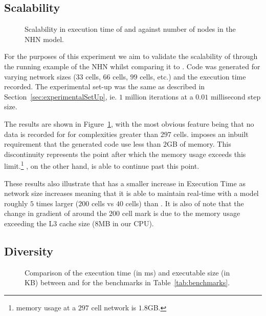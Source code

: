 \subsection{Scalability}

\begin{figure}[htbp]
  \centering
  
  \caption{Scalability in  execution time of \simulink and \ourTool against 
  number of nodes in the \acf{NHN} model.}
  \label{fig:scalability}
\end{figure}

For the purposes of this experiment we aim to validate the scalability of
\ourTool through the running example of the \ac{NHN} whilst comparing it
to \simulink.  Code was generated for varying network sizes ($33$ cells,
$66$ cells, $99$ cells, etc.) and the execution time recorded.  The
experimental set-up was the same as described in
Section~\ref{sec:experimentalSetUp}, ie. $1$ million iterations at a
$0.01$ millisecond step size.

The results are shown in Figure~\ref{fig:scalability}, with the most
obvious feature being that no data is recorded for \simulink for
complexities greater than $297$ cells.  \simulink imposes an inbuilt
requirement that the generated code use less than $2$GB of memory. This
discontinuity represents the point after which the memory usage exceeds
this limit.\footnote{\simulink memory usage at a $297$ cell network is
  $1.8$GB.}  \ourTool, on the other hand, is able to continue past this
point.

These results also illustrate that \ourTool has a smaller increase in
Execution Time as network size increases meaning that it is able to
maintain real-time with a model roughly $5$ times larger ($200$ cells vs
$40$ cells) than \simulink.  It is also of note that the change in
gradient of \ourTool around the $200$ cell mark is due to the memory
usage exceeding the L$3$ cache size ($8$MB in our CPU).


\subsection{Diversity}
\label{sec:diversity}

\begin{figure}[htbp]
  \centering
  \caption{Comparison of the execution time (in ms) and executable size
    (in KB) between \simulink and \ourTool for the benchmarks in
    Table~\ref{tab:benchmarks}.}
  \label{fig:results}
\end{figure}

